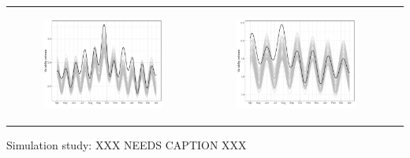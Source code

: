 \documentclass[11pt]{article}
\begin{document}
\begin{suppfigure}[ht]
\begin{tabular}{lll}
\begin{subfigure}[t]{0.30\linewidth}
		\includegraphics[width=1\linewidth]{figs/supp-figure-9e.pdf}
	\end{subfigure}&
	\begin{subfigure}[t]{0.30\linewidth}
		\centering
		\includegraphics[width=1\linewidth]{figs/supp-figure-9f.pdf}
	\end{subfigure}\\	
    \end{tabular}
    \caption{Simulation study: XXX NEEDS CAPTION XXX}
    \label{fig:simulation}
\end{suppfigure}
\end{document}
